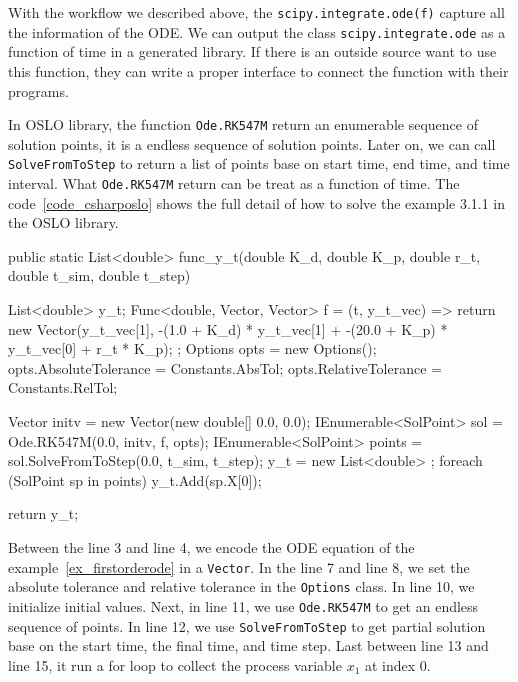 With the workflow we described above, the \verb|scipy.integrate.ode(f)| capture all the information of the ODE. We can output the class \verb|scipy.integrate.ode| as a function of time in a generated library. If there is an outside source want to use this function, they can write a proper interface to connect the function with their programs. 

In OSLO library, the function \verb|Ode.RK547M| return an enumerable sequence of solution points, it is a endless sequence of solution points. Later on, we can call \verb|SolveFromToStep| to return a list of points base on start time, end time, and time interval. What \verb|Ode.RK547M| return can be treat as a function of time. The code~\ref{code_csharposlo} shows the full detail of how to solve the example 3.1.1 in the OSLO library.

\begin{listing}[ht]
\begin{csharp1}
public static List<double> func_y_t(double K_d, double K_p, double r_t, double t_sim, double t_step) {
    List<double> y_t;
    Func<double, Vector, Vector> f = (t, y_t_vec) => {
        return new Vector(y_t_vec[1], -(1.0 + K_d) * y_t_vec[1] + -(20.0 + K_p) * y_t_vec[0] + r_t * K_p);
    };
    Options opts = new Options();
    opts.AbsoluteTolerance = Constants.AbsTol;
    opts.RelativeTolerance = Constants.RelTol;
    
    Vector initv = new Vector(new double[] {0.0, 0.0});
    IEnumerable<SolPoint> sol = Ode.RK547M(0.0, initv, f, opts);
    IEnumerable<SolPoint> points = sol.SolveFromToStep(0.0, t_sim, t_step);
    y_t = new List<double> {};
    foreach (SolPoint sp in points) {
        y_t.Add(sp.X[0]);
    }
    
    return y_t;
}
\end{csharp1}
\label{code_csharposlo}
\end{listing}

Between the line 3 and line 4, we encode the ODE equation of the example~\ref{ex_firstorderode} in a \verb|Vector|. In the line 7 and line 8, we set the absolute tolerance and relative tolerance in the \verb|Options| class. In line 10, we initialize initial values. Next, in line 11, we use \verb|Ode.RK547M| to get an endless sequence of points. In line 12, we use \verb|SolveFromToStep| to get partial solution base on the start time, the final time, and time step. Last between line 13 and line 15, it run a for loop to collect the process variable $x_1$ at index 0.

